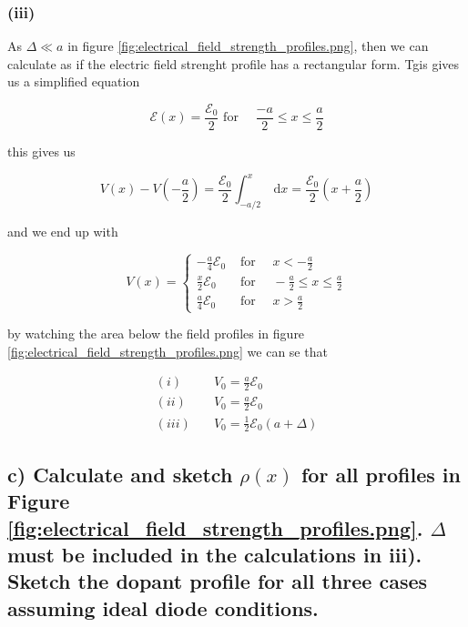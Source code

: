 \subsubsection*{(iii)}

As $\Delta\ll a$ in figure \ref{fig:electrical_field_strength_profiles.png}, then we can calculate as if the electric field strenght profile has a rectangular form. Tgis gives us a simplified equation

\[ \mathscr{E}(x)=\frac{\mathscr{E}_{0}}{2} \text { for } \quad \frac{-a}{2} \leq x \leq \frac{a}{2} \]

this gives us 

\[ V(x)-V\left(-\frac{a}{2}\right)=\frac{\mathscr{E}_{0}}{2} \int_{-a / 2}^{x} \mathrm{~d} x=\frac{\mathscr{E}_{0}}{2}\left(x+\frac{a}{2}\right) \]

and we end up with 

\[ V(x)=\left\{\begin{array}{ll}-\frac{a}{4} \mathscr{E}_{0} & \text { for } \quad x<-\frac{a}{2} \\ \frac{x}{2} \mathscr{E}_{0} & \text { for } \quad-\frac{a}{2} \leq x \leq \frac{a}{2} \\ \frac{a}{4} \mathscr{E}_{0} & \text { for } \quad x>\frac{a}{2}\end{array}\right. \]


by watching the area below the field profiles in figure \ref{fig:electrical_field_strength_profiles.png} we can se that

\begin{align*}
    (i)  & \quad V_{0}=\frac{a}{2} \mathscr{E}_{0}\\
    (ii)  & \quad V_{0}=\frac{a}{2} \mathscr{E}_{0}\\
    (iii) & \quad V_{0}=\frac{1}{2} \mathscr{E}_{0}(a+\Delta) 
\end{align*}

\subsection*{c) Calculate and sketch \( \rho(x) \) for all profiles in Figure \ref{fig:electrical_field_strength_profiles.png}. \( \Delta \) must be included in the calculations in iii). Sketch the dopant profile for all three cases assuming ideal diode conditions.}

